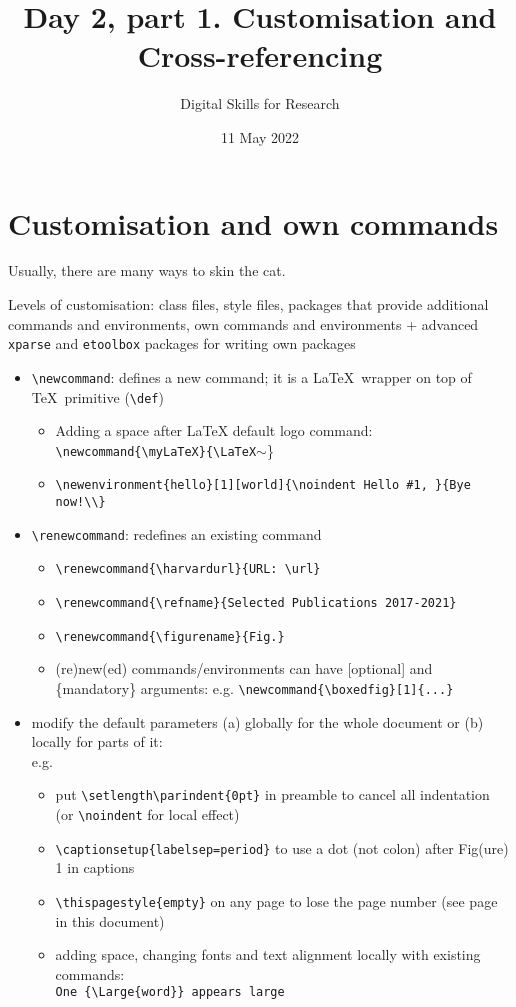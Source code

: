 \documentclass[a4paper,11pt]{article}
\title{Day 2, part 1. Customisation and Cross-referencing}
\author{Digital Skills for Research}
\date{11 May 2022}
\newcommand{\myLaTeX}{\LaTeX~}
\renewcommand*{\figurename}{Fig.}
\newcommand{\boxedfig}[1]{%
	\setlength{\fboxsep}{5pt}%
	\setlength{\fboxrule}{3pt}%
	\fbox{\texttt{[image: \#1]}}%
}
\begin{document}
\maketitle
\tableofcontents

\section{Customisation and own commands}\label{sec:own}


Usually, there are many ways to skin the \hypertarget{wd:random}{cat}.

Levels of customisation: 
class files, style files, packages that provide additional commands and environments, own commands and environments + advanced \texttt{xparse} and \texttt{etoolbox} packages for writing own packages

\begin{itemize}
	\item \verb|\newcommand|: defines a new command; it is a \myLaTeX wrapper on top of \TeX~primitive (\verb|\def|) 
	\begin{itemize}
		\item Adding a space after LaTeX default logo command: \\
		\verb|\newcommand{\myLaTeX}{\LaTeX|$\sim$\}
		\item \verb|\newenvironment{hello}[1][world]{\noindent Hello #1, }{Bye now!\\}|
	\end{itemize}
	\item \verb|\renewcommand|: redefines an existing command
	\begin{itemize}
		\item \verb|\renewcommand{\harvardurl}{URL: \url}|
		\item \verb|\renewcommand{\refname}{Selected Publications 2017-2021}|
		\item \verb|\renewcommand{\figurename}{Fig.}|
		\item (re)new(ed) commands/environments can have [optional] and \{mandatory\} arguments: e.g. \verb|\newcommand{\boxedfig}[1]{...}|
		
	\end{itemize}
	\item modify the default parameters (a) globally for the whole document or (b) locally for parts of it: \\ e.g. 
	\begin{itemize}
		\item put \verb|\setlength\parindent{0pt}| in preamble to cancel all indentation (or \verb|\noindent| for local effect)
		\item \verb|\captionsetup{labelsep=period}| to use a dot (not colon) after Fig(ure) 1 in captions
		\item \verb|\thispagestyle{empty}| on any page to lose the page number (see page \pageref{pg:empty} in this document)
		\item adding space, changing fonts and text alignment locally with existing commands: \\ 
		\verb|One {\Large{word}} appears large|
	\end{itemize}
	
\end{itemize}
\end{document}
